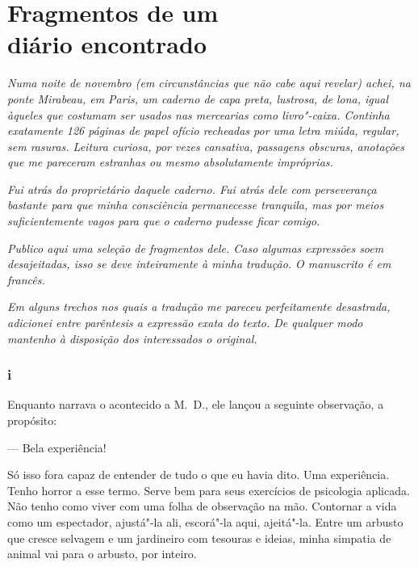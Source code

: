 \clearpage
\thispagestyle{empty}
\movetooddpage
{}
\part*{Fragmentos de um\\ diário encontrado}

\vspace*{1.5cm}

\emph{Numa noite de novembro (em circunstâncias que não cabe aqui
revelar) achei, na ponte Mirabeau, em Paris, um caderno de capa preta,
lustrosa, de lona, igual àqueles que costumam ser usados nas
mercearias como livro"-caixa. Continha exatamente 126 páginas de papel
ofício recheadas por uma letra miúda, regular, sem rasuras. Leitura
curiosa, por vezes cansativa, passagens obscuras, anotações que me
pareceram estranhas ou mesmo absolutamente impróprias.}

\emph{Fui atrás do proprietário daquele caderno. Fui atrás dele com
perseverança bastante para que minha consciência permanecesse tranquila,
mas por meios suficientemente vagos para que o caderno pudesse ficar comigo.}

\emph{Publico aqui uma seleção de fragmentos dele. Caso algumas
expressões soem desajeitadas, isso se deve inteiramente à minha
tradução. O manuscrito é em francês.}

\emph{Em alguns trechos nos quais a tradução me pareceu perfeitamente
desastrada, adicionei entre parêntesis a expressão exata do texto. De
qualquer modo mantenho à disposição dos interessados o original.}

\pagebreak

\section{i}

Enquanto narrava o acontecido a M.~D., ele lançou a seguinte
observação, a propósito:

--- Bela experiência!

Só isso fora capaz de entender de tudo o que eu havia dito. Uma
experiência. Tenho horror a esse termo. Serve bem para seus
exercícios de psicologia aplicada. Não tenho como viver com uma folha de
observação na mão. Contornar a vida como um espectador, ajustá"-la ali,
escorá"-la aqui, ajeitá"-la. Entre um arbusto que cresce selvagem e um
jardineiro com tesouras e ideias, minha simpatia de animal vai para o
arbusto, por inteiro.


